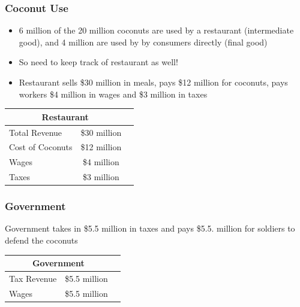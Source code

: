 \documentclass{beamer}
\begin{document}
\begin{frame}
\frametitle[alignment=center]{Coconut Use}
\begin{itemize}
\item 6 million of the 20 million coconuts are used by a restaurant (intermediate good), and 4 million are used by by consumers directly (final good)
\bigskip
\item So need to keep track of restaurant as well!
\bigskip
\item Restaurant sells \$30 million in meals, pays \$12 million for coconuts, pays workers \$4 million in wages and \$3 million in taxes
\end{itemize}
\begin{table}
\begin{tabular}{lcc}
\hline\hline
\multicolumn{2}{c}{Restaurant}\\
\hline
Total Revenue & \$30 million\\
Cost of Coconuts & \$12 million\\
Wages & \$4 million\\
Taxes & \$3 million\\
\hline\hline
\end{tabular}
\end{table}
\end{frame}


\begin{frame}
\frametitle[alignment=center]{Government}
 Government takes in \$5.5 million in taxes and pays \$5.5. million for soldiers to defend the coconuts
\begin{table}
\begin{tabular}{lcc}
\hline\hline
\multicolumn{2}{c}{Government}\\
\hline
Tax Revenue & \$5.5 million\\
Wages & \$5.5 million\\
\hline\hline
\end{tabular}
\end{table}
\end{frame}
\end{document}
